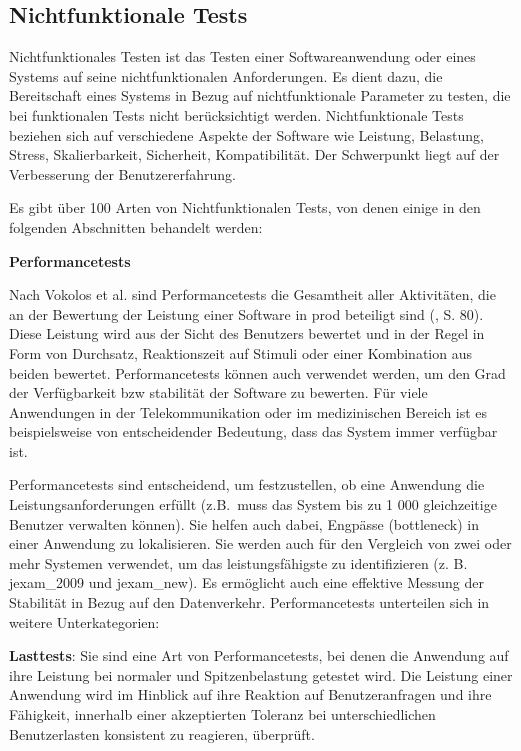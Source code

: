 \subsection{Nichtfunktionale Tests}

Nichtfunktionales Testen ist das Testen einer Softwareanwendung oder
eines Systems auf seine nichtfunktionalen Anforderungen. Es dient dazu,
die Bereitschaft eines Systems in Bezug auf nichtfunktionale Parameter zu
testen, die bei funktionalen Tests nicht berücksichtigt werden.
Nichtfunktionale Tests beziehen sich auf verschiedene Aspekte der Software
wie Leistung, Belastung, Stress, Skalierbarkeit, Sicherheit, Kompatibilität.
Der Schwerpunkt liegt auf der Verbesserung der Benutzererfahrung.


Es gibt über 100 Arten von Nichtfunktionalen Tests, von denen einige in den
folgenden Abschnitten behandelt werden:

\textbf{Performancetests}

Nach Vokolos et al. sind Performancetests die Gesamtheit aller Aktivitäten,
die an der Bewertung der Leistung einer Software in \Gls{prod}
beteiligt sind (\cite{vokolos1998performance}, S. 80).
Diese Leistung wird aus der Sicht des Benutzers bewertet und in der
Regel in Form von Durchsatz, Reaktionszeit auf Stimuli oder einer
Kombination aus beiden bewertet. Performancetests können auch verwendet
werden, um den Grad der Verfügbarkeit bzw stabilität der Software zu
bewerten. Für viele Anwendungen in der Telekommunikation oder im
medizinischen Bereich ist es beispielsweise von entscheidender Bedeutung,
dass das System immer verfügbar ist.


Performancetests sind entscheidend, um festzustellen, ob eine Anwendung die
Leistungsanforderungen erfüllt (z.B.\ muss das System bis zu 1 000
gleichzeitige Benutzer verwalten können). Sie helfen auch dabei, Engpässe
(\Gls{bottleneck}) in einer Anwendung zu lokalisieren. Sie werden auch
für den Vergleich von zwei oder mehr Systemen verwendet, um das
leistungsfähigste zu identifizieren (z. B. \Gls{jexam_2009}  und \Gls{jexam_new}).
Es ermöglicht auch eine effektive Messung der Stabilität in Bezug auf den
Datenverkehr. Performancetests unterteilen sich in weitere Unterkategorien:


\textbf{Lasttests}: Sie sind eine Art von Performancetests,
bei denen die Anwendung auf ihre Leistung bei normaler und Spitzenbelastung
getestet wird. Die Leistung einer Anwendung wird im Hinblick auf ihre Reaktion
auf Benutzeranfragen und ihre Fähigkeit, innerhalb einer akzeptierten Toleranz
bei unterschiedlichen Benutzerlasten konsistent zu reagieren, überprüft.


